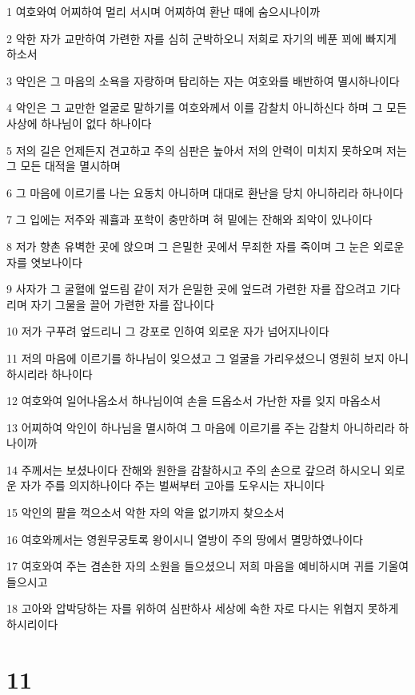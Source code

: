 \par 1 여호와여 어찌하여 멀리 서시며 어찌하여 환난 때에 숨으시나이까
\par 2 악한 자가 교만하여 가련한 자를 심히 군박하오니 저희로 자기의 베푼 꾀에 빠지게 하소서
\par 3 악인은 그 마음의 소욕을 자랑하며 탐리하는 자는 여호와를 배반하여 멸시하나이다
\par 4 악인은 그 교만한 얼굴로 말하기를 여호와께서 이를 감찰치 아니하신다 하며 그 모든 사상에 하나님이 없다 하나이다
\par 5 저의 길은 언제든지 견고하고 주의 심판은 높아서 저의 안력이 미치지 못하오며 저는 그 모든 대적을 멸시하며
\par 6 그 마음에 이르기를 나는 요동치 아니하며 대대로 환난을 당치 아니하리라 하나이다
\par 7 그 입에는 저주와 궤휼과 포학이 충만하며 혀 밑에는 잔해와 죄악이 있나이다
\par 8 저가 향촌 유벽한 곳에 앉으며 그 은밀한 곳에서 무죄한 자를 죽이며 그 눈은 외로운 자를 엿보나이다
\par 9 사자가 그 굴혈에 엎드림 같이 저가 은밀한 곳에 엎드려 가련한 자를 잡으려고 기다리며 자기 그물을 끌어 가련한 자를 잡나이다
\par 10 저가 구푸려 엎드리니 그 강포로 인하여 외로운 자가 넘어지나이다
\par 11 저의 마음에 이르기를 하나님이 잊으셨고 그 얼굴을 가리우셨으니 영원히 보지 아니하시리라 하나이다
\par 12 여호와여 일어나옵소서 하나님이여 손을 드옵소서 가난한 자를 잊지 마옵소서
\par 13 어찌하여 악인이 하나님을 멸시하여 그 마음에 이르기를 주는 감찰치 아니하리라 하나이까
\par 14 주께서는 보셨나이다 잔해와 원한을 감찰하시고 주의 손으로 갚으려 하시오니 외로운 자가 주를 의지하나이다 주는 벌써부터 고아를 도우시는 자니이다
\par 15 악인의 팔을 꺽으소서 악한 자의 악을 없기까지 찾으소서
\par 16 여호와께서는 영원무궁토록 왕이시니 열방이 주의 땅에서 멸망하였나이다
\par 17 여호와여 주는 겸손한 자의 소원을 들으셨으니 저희 마음을 예비하시며 귀를 기울여 들으시고
\par 18 고아와 압박당하는 자를 위하여 심판하사 세상에 속한 자로 다시는 위협지 못하게 하시리이다

\chapter{11}

